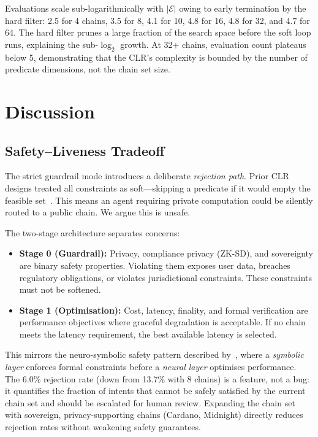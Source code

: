 \documentclass[conference, 10pt, twocolumn]{IEEEtran}
\begin{document}
Evaluations scale sub-logarithmically with $|\mathcal{E}|$ owing to
early termination by the hard filter: 2.5 for 4 chains, 3.5 for 8,
4.1 for 10, 4.8 for 16, 4.8 for 32, and 4.7 for 64.  The hard filter
prunes a large fraction of the search space before the soft loop runs,
explaining the sub-$\log_2$ growth.  At 32+ chains, evaluation count
plateaus below 5, demonstrating that the CLR's complexity is bounded
by the number of predicate dimensions, not the chain set size.

\section{Discussion}
\label{sec:discussion}

\subsection{Safety--Liveness Tradeoff}

The strict guardrail mode introduces a deliberate \emph{rejection
path}.  Prior CLR designs treated all constraints as soft---skipping
a predicate if it would empty the feasible set~\cite{quinlan1986induction}.
This means an agent requiring private computation could be silently
routed to a public chain.  We argue this is unsafe.

The two-stage architecture separates concerns:
\begin{itemize}[leftmargin=*]
  \item \textbf{Stage 0 (Guardrail):} Privacy, compliance privacy
    (ZK-SD), and sovereignty are binary safety properties.  Violating
    them exposes user data, breaches regulatory obligations, or
    violates jurisdictional constraints.  These constraints must not
    be softened.
  \item \textbf{Stage 1 (Optimisation):} Cost, latency, finality,
    and formal verification are performance objectives where graceful
    degradation is acceptable.  If no chain meets the latency
    requirement, the best available latency is selected.
\end{itemize}

This mirrors the neuro-symbolic safety pattern described
by~\citet{garcez2023neurosymbolic}, where a \emph{symbolic layer}
enforces formal constraints before a \emph{neural layer} optimises
performance.  The 6.0\% rejection rate (down from 13.7\% with 8
chains) is a feature, not a bug: it quantifies the fraction of
intents that cannot be safely satisfied by the current chain set and
should be escalated for human review.  Expanding the chain set with
sovereign, privacy-supporting chains (Cardano, Midnight) directly
reduces rejection rates without weakening safety guarantees.
\end{document}
